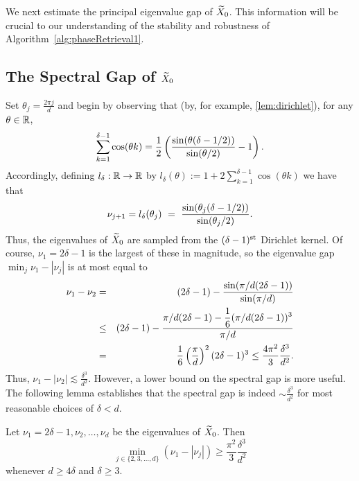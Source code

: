 We next estimate the principal eigenvalue gap of $\widetilde{X}_0$.  This information will be crucial to our understanding of the stability and robustness of Algorithm~\ref{alg:phaseRetrieval1}.  

\subsection{The Spectral Gap of $\widetilde{X}_0$}

Set $\theta_j = \frac{2 \pi j}{d}$ and begin by observing that (by, for example, \cref{lem:dirichlet}), for any $\theta \in \mathbb{R}$, \[\sum_{k = 1}^{\delta - 1}\cos(\theta k) = \frac{\displaystyle 1}{\displaystyle 2}\left(\frac{\displaystyle \sin(\theta(\delta - 1/2))}{\displaystyle \sin(\theta / 2)} - 1\right).\]  Accordingly, defining $l_\delta : \mathbb{R} \to \mathbb{R}$ by $l_\delta(\theta) := 1 + 2\sum_{k=1}^{\delta - 1} \cos(\theta k)$ we have that
\begin{equation}
  \nu_{j+1} = l_\delta(\theta_j) ~=~ \frac{\displaystyle \sin(\theta_j(\delta - 1/2))}{\displaystyle \sin(\theta_j / 2)}. \label{equ:EigenFormula}
\end{equation}
Thus, the eigenvalues of $\widetilde{X}_0$ are sampled from the $(\delta-1)^{\rm st}$ Dirichlet kernel.  
Of course, $\nu_1 = 2\delta - 1$ is the largest of these in magnitude, so the eigenvalue gap $\min_j \nu_1 - |\nu_j|$ is at most equal to
\begin{eqnarray*}
  \nu_1 - \nu_2 & = & (2\delta -  1) - \frac{\displaystyle \sin(\pi / d (2\delta - 1))}{\displaystyle \sin(\pi / d)} \\
  & \le & (2 \delta - 1) - \frac{\displaystyle \pi / d(2 \delta - 1) - \frac{1}{6}(\pi / d (2 \delta - 1))^3}{\displaystyle \pi / d} \\
  & = & \frac{1}{6}\left(\frac{\pi}{d}\right)^2(2 \delta - 1)^3 \le \frac{4\pi^2}{3} \frac{\delta^3}{d^2} \label{equ:gap12}.
\end{eqnarray*}
Thus, $\nu_1 - |\nu_2 | \lesssim \frac{\delta^3}{d^2}$.  However, a lower bound on the spectral gap is more useful.  The following lemma establishes that the spectral gap is indeed $\sim \frac{\delta^3}{d^2}$ for most reasonable choices of $\delta < d$.

\begin{lemma}
Let $\nu_1 = 2 \delta -1, \nu_2, \dots, \nu_d$ be the eigenvalues of $\widetilde{X}_0$.  Then
$$\min_{j \in \{2, 3, \dots, d \} } (\nu_1 - |\nu_j| ) \geq \dfrac{\pi^2}{3} \frac{\delta^3}{d^2}$$
whenever $d \geq 4\delta$ and $\delta \geq 3$.
\label{lem:EigGap}
\end{lemma}

